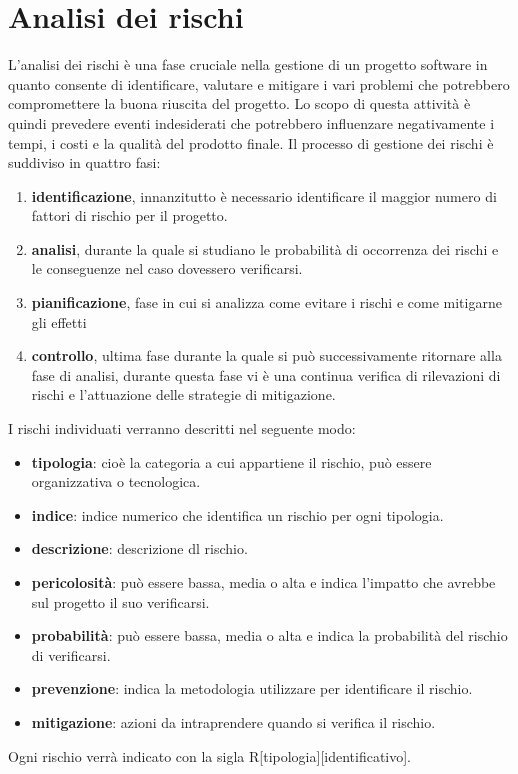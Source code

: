 \documentclass[a4paper, 12pt]{article}
\begin{document}
\section{Analisi dei rischi}
\label{sec:adr}
L'analisi dei rischi è una fase cruciale nella gestione di un progetto software in quanto consente di identificare, valutare e mitigare
i vari problemi che potrebbero compromettere la buona riuscita del progetto. Lo scopo di questa attività è quindi prevedere eventi indesiderati
che potrebbero influenzare negativamente i tempi, i costi e la qualità del prodotto finale.
Il processo di gestione dei rischi è suddiviso in quattro fasi:
\begin{enumerate}
    \item \textbf{identificazione}, innanzitutto è necessario identificare il maggior numero di fattori di rischio per il progetto.
    \item \textbf{analisi}, durante la quale si studiano le probabilità di occorrenza dei rischi e le conseguenze nel caso dovessero verificarsi.
    \item \textbf{pianificazione}, fase in cui si analizza come evitare i rischi e come mitigarne gli effetti 
    \item \textbf{controllo}, ultima fase durante la quale si può successivamente ritornare alla fase di analisi, durante questa fase vi è una continua verifica di rilevazioni di rischi e 
    l'attuazione delle strategie di mitigazione. 
\end{enumerate}
I rischi individuati verranno descritti nel seguente modo:
\begin{itemize}
    \item \textbf{tipologia}: cioè la categoria a cui appartiene il rischio, può essere organizzativa o tecnologica.
    \item \textbf{indice}: indice numerico che identifica un rischio per ogni tipologia.
    \item \textbf{descrizione}: descrizione dl rischio.
    \item \textbf{pericolosità}: può essere bassa, media o alta e indica l'impatto che avrebbe sul progetto il suo verificarsi.
    \item \textbf{probabilità}: può essere bassa, media o alta e indica la probabilità del rischio di verificarsi.
    \item \textbf{prevenzione}: indica la metodologia utilizzare per identificare il rischio.
    \item \textbf{mitigazione}: azioni da intraprendere quando si verifica il rischio.   
\end{itemize}
Ogni rischio verrà indicato con la sigla R[tipologia][identificativo].
\end{document}
